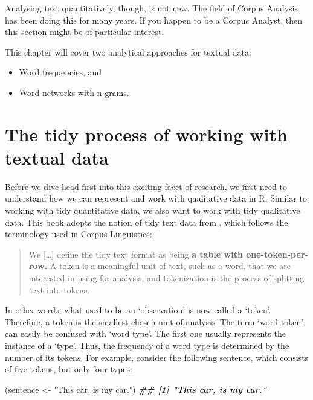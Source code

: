 \documentclass[
]{book}
\newenvironment{Shaded}{\begin{snugshade}}{\end{snugshade}}
\newcommand{\DocumentationTok}[1]{\textcolor[rgb]{0.56,0.35,0.01}{\textbf{\textit{#1}}}}
\newcommand{\NormalTok}[1]{#1}
\newcommand{\OtherTok}[1]{\textcolor[rgb]{0.56,0.35,0.01}{#1}}
\newcommand{\StringTok}[1]{\textcolor[rgb]{0.31,0.60,0.02}{#1}}
\begin{document}
Analysing text quantitatively, though, is not new. The field of Corpus Analysis has been doing this for many years. If you happen to be a Corpus Analyst, then this section might be of particular interest.

This chapter will cover two analytical approaches for textual data:

\begin{itemize}
\item
  Word frequencies, and
\item
  Word networks with n-grams.
\end{itemize}

\hypertarget{tidy-process-for-textual-data}{%
\section{The tidy process of working with textual data}\label{tidy-process-for-textual-data}}

Before we dive head-first into this exciting facet of research, we first need to understand how we can represent and work with qualitative data in R. Similar to working with tidy quantitative data, we also want to work with tidy qualitative data. This book adopts the notion of tidy text data from \citet{silge2017text}, which follows the terminology used in Corpus Linguistics:

\begin{quote}
We {[}\ldots{]} define the tidy text format as being \textbf{a table with one-token-per-row.} A token is a meaningful unit of text, such as a word, that we are interested in using for analysis, and tokenization is the process of splitting text into tokens.
\end{quote}

In other words, what used to be an `observation' is now called a `token'. Therefore, a token is the smallest chosen unit of analysis. The term `word token' can easily be confused with `word type'. The first one usually represents the instance of a `type'. Thus, the frequency of a word type is determined by the number of its tokens. For example, consider the following sentence, which consists of five tokens, but only four types:

\begin{Shaded}
\begin{Highlighting}[]
\NormalTok{(sentence }\OtherTok{\textless{}{-}} \StringTok{"This car, is my car."}\NormalTok{)}
\DocumentationTok{\#\# [1] "This car, is my car."}
\end{Highlighting}
\end{Shaded}
\end{document}
